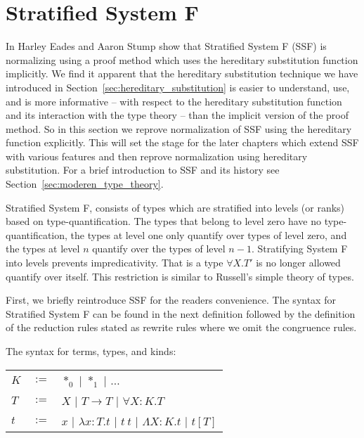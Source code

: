 \section{Stratified System F }
\label{subsec:normalization_stratified_system_f}
In \cite{Eades:2010} Harley Eades and Aaron Stump show that
Stratified System F (SSF)  is
normalizing using a proof method which uses the hereditary
substitution function implicitly.  We find it apparent that the
hereditary substitution technique we have introduced in
Section~\ref{sec:hereditary_substitution} is easier to understand,
use, and is more informative -- with respect to the hereditary
substitution function and its interaction with the type theory -- than
the implicit version of the proof method.  So in this section we
reprove normalization of SSF using the hereditary function explicitly.
This will set the stage for the later chapters which extend SSF with
various features and then reprove normalization using hereditary
substitution.  For a brief introduction to SSF and its history see
Section~\ref{sec:moderen_type_theory}.

Stratified System F, consists of types which are stratified into
levels (or ranks) based on
type-quantification.  The types that belong
to level zero have no type-quantification, the types at level one only
quantify over types of level zero, and the types at level $n$ quantify
over the types of level $n-1$.  Stratifying System F into levels
prevents impredicativity.  That is a type $\forall X.T'$ is no
longer allowed quantify over itself.  This restriction is similar to
Russell's simple theory of types.

First, we briefly reintroduce SSF for the readers convenience.  The
syntax for Stratified System F can be found in the next definition
followed by the definition of the reduction rules stated as rewrite
rules where we omit the congruence rules.
\begin{definition}
  \label{def:syntax_ssf}
  The syntax for terms, types, and kinds:
  \begin{center}
    \begin{tabular}{lll}
      $K$ & $:=$ & $*_0$ $|$ $*_1$             $|$ $\ldots$\\
      $T$ & $:=$ & $X$   $|$ $T \rightarrow T$ $|$ $\forall X:K.T$\\
      $t$ & $:=$ & $x$   $|$ $\lambda x:T.t$   $|$ $t\ t$ $|$ $\Lambda X:K.t$ $|$ $t[T]$\\
    \end{tabular}
  \end{center}
\end{definition}


